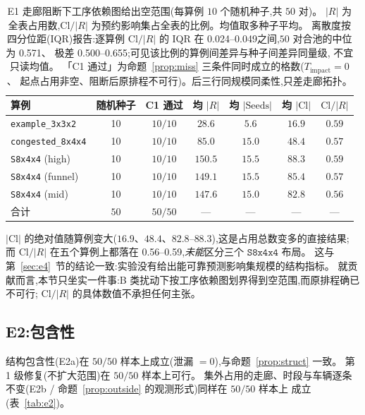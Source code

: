 \documentclass[manuscript,screen,review]{acmart}
\newcommand{\NSeeds}{10}
\newcommand{\NPairs}{50}
\newcommand{\PassMiss}{\NPairs/\NPairs}      %
\newcommand{\PassClosed}{\NPairs/\NPairs}    %
\newcommand{\PassInvar}{\NPairs/\NPairs}     %
\newcommand{\EoneCloLo}{0.56}
\newcommand{\EoneCloHi}{0.59}
\newcommand{\EoneFracIqrLo}{0.024}  %
\newcommand{\EoneFracIqrHi}{0.049}  %
\newcommand{\EoneFracMed}{0.571}    %
\newcommand{\EoneFracMin}{0.500}    %
\newcommand{\EoneFracMax}{0.655}    %
\begin{document}
\begin{table}[t]
\centering
\caption{E1 走廊阻断下工序依赖图给出空范围(每算例 \(\NSeeds\) 个随机种子,共 \(\NPairs\) 对)。
\(|R|\) 为全表占用数,\(\mathrm{Cl}/|R|\) 为预约影响集占全表的比例。均值取多种子平均。
离散度按四分位距(IQR)报告:逐算例 \(\mathrm{Cl}/|R|\) 的 IQR 在
\EoneFracIqrLo--\EoneFracIqrHi 之间,\(\NPairs\) 对合池的中位为 \EoneFracMed、
极差 \EoneFracMin--\EoneFracMax;可见该比例的算例间差异与种子间差异同量级,
不宜只读均值。
「C1 通过」为命题~\ref{prop:miss} 三条件同时成立的格数(\(T_{\mathrm{impact}}=0\)、
起点占用非空、阻断后原排程不可行)。后三行同规模同柔性,只差走廊拓扑。}
\label{tab:e1}
\small
\begin{tabular}{@{}lcccccc@{}}
\toprule
算例 & 随机种子 & C1 通过 & 均 \(|R|\) & 均 \(|\mathrm{Seeds}|\)
 & 均 \(|\mathrm{Cl}|\) & \(\mathrm{Cl}/|R|\) \\
\midrule
\texttt{example\_3x3x2}   & 10 & \(10/10\) & \(28.6\)  & \(5.6\)  & \(16.9\) & \(0.59\) \\
\texttt{congested\_8x4x4} & 10 & \(10/10\) & \(85.0\)  & \(15.0\) & \(48.4\) & \(0.57\) \\
\texttt{S8x4x4} (high)    & 10 & \(10/10\) & \(150.5\) & \(15.5\) & \(88.3\) & \(0.59\) \\
\texttt{S8x4x4} (funnel)  & 10 & \(10/10\) & \(149.1\) & \(15.5\) & \(85.4\) & \(0.57\) \\
\texttt{S8x4x4} (mid)     & 10 & \(10/10\) & \(147.6\) & \(15.0\) & \(82.8\) & \(0.56\) \\
\midrule
合计 & \(\NPairs\) & \(\PassMiss\) & --- & --- & --- & --- \\
\bottomrule
\end{tabular}
\end{table}

\(|\mathrm{Cl}|\) 的绝对值随算例变大(\(16.9\)、\(48.4\)、\(82.8\)--\(88.3\)),这是占用总数变多的直接结果;
而 \(\mathrm{Cl}/|R|\) 在五个算例上都落在 \EoneCloLo--\EoneCloHi,\emph{未能}区分三个 \(\texttt{S8x4x4}\) 布局。
这与第~\ref{sec:e4}~节的结论一致:实验没有给出能可靠预测影响集规模的结构指标。
就贡献而言,本节只坐实一件事:B 类扰动下按工序依赖图划界得到空范围,而原排程确已不可行;
\(\mathrm{Cl}/|R|\) 的具体数值不承担任何主张。

\subsection{E2:包含性}
\label{sec:e2}

结构包含性(E2a)在 \(\PassClosed\) 样本上成立(泄漏 \(=0\)),与命题~\ref{prop:struct} 一致。
第 1 级修复(不扩大范围)在 \(\NPairs/\NPairs\) 样本上可行。
集外占用的走廊、时段与车辆逐条不变(E2b / 命题~\ref{prop:outside} 的观测形式)同样在 \(\PassInvar\) 样本上
成立(表~\ref{tab:e2})。
\end{document}
